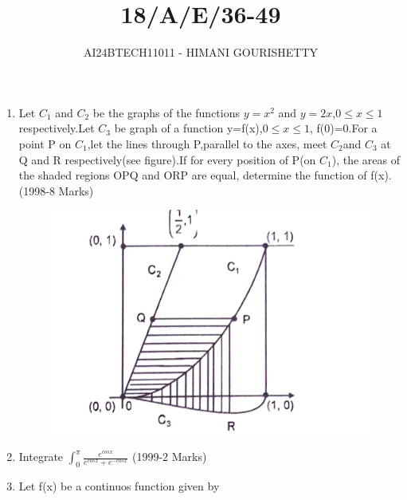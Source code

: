 \documentclass[journal,12pt,twocolumn]{IEEEtran}
\theoremstyle{remark}
\begin{document}

\vspace{3cm}

\title{18/A/E/36-49}
\author{AI24BTECH11011 - HIMANI GOURISHETTY}
\maketitle
\newpage
\bigskip

\renewcommand{\thefigure}{\theenumi}
\renewcommand{\thetable}{\theenumi}


\begin{enumerate}
	\item Let $C_1$ and $C_2$ be the graphs of the functions $y=x^2$ and $y=2x$,$0\le x\le1$ respectively.Let $C_3$ be graph of a function y=f(x),$0\le x \le 1$, f(0)=0.For a point P on $C_1$,let the lines through P,parallel to the axes, meet $C_2$and $C_3$ at Q and R respectively(see figure).If for every position of P(on $C_1$), the areas of the shaded regions OPQ and ORP are equal, determine the function of f(x).
\hfill{(1998-8 Marks)}
\begin{figure}[h!]
\centering
\includegraphics[width=1\linewidth]{figs/fig1.png}
\label{fig:11011}
\end{figure}
				        
\item Integrate $\int_{0}^{\pi}\frac{e^{cosx}}{e^{cosx}+e^{-cosx}}$
\hfill{(1999-2 Marks)}\\	             
							      
							      \item Let f(x) be a continuos function given by \\


\end{enumerate}
\end{document}
